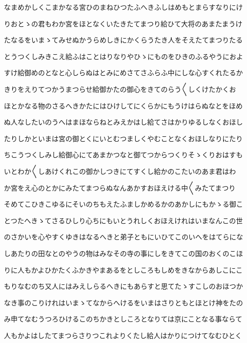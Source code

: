 \documentclass[a4paper,11pt,landscape]{ltjtarticle}
\begin{document}
\par\medskip
なまめかしくこまかなる宮ひのまねひつたふへきふしはめもとまらすなりにけ
\par\medskip
りおとゝの君もわか宮をほとなくいたきたてまつり給ひて大将のあまたまうけ
\par\medskip
たなるをいまゝてみせぬかうらめしきにかくらうたき人をそえたてまつりたる
\par\medskip
とうつくしみきこえ給ふはことはりなりやひゝにものをひきのふるやうにおよ
\par\medskip
すけ給御めのとなと心しらぬはとみにめさてさふらふ中にしな心すくれたるか
\par\medskip
きりをえりてつかうまつらせ給御かたの御心をきてのらう〱しくけたかくお
\par\medskip
ほとかなる物のさるへきかたにはひけしてにくらかにもうけはらぬなとをほめ
\par\medskip
ぬ人なしたいのうへはまほならねとみえかはし給てさはかりゆるしなくおほし
\par\medskip
たりしかといまは宮の御とくにいとむつましくやむことなくおほしなりにたり
\par\medskip
ちこうつくしみし給御心にてあまかつなと御てつからつくりそゝくりおはすも
\par\medskip
いとわか〱しあけくれこの御かしつきにてすくし給かのこたいのあま君はわ
\par\medskip
か宮をえ心のとかにみたてまつらぬなんあかすおほえける中〱みたてまつり
\par\medskip
そめてこひきこゆるにそいのちもえたふましかめるかのあかしにもかゝる御こ
\par\medskip
とつたへきゝてさるひしり心ちにもいとうれしくおほえけれはいまなんこの世
\par\medskip
のさかいを心やすくゆきはなるへきと弟子ともにいひてこのいへをはてらにな
\par\medskip
しあたりの田なとのやうの物はみなその寺の事にしをきてこの国のおくのこほ
\par\medskip
りに人もかよひかたくふかきやまあるをとしころもしめをきなからあしこにこ
\par\medskip
もりなむのち又人にはみえしらるへきにもあらすと思てたゝすこしのおほつか
\par\medskip
なき事のこりけれはいまゝてなからへけるをいまはさりともとほとけ神をたの
\par\medskip
み申てなむうつろひけるこのちかきとしころとなりては京にことなる事ならて
\par\medskip
人もかよはしたてまつらさりつこれよりくたし給人はかりにつけてなむひとく
\par\medskip
\end{document}
